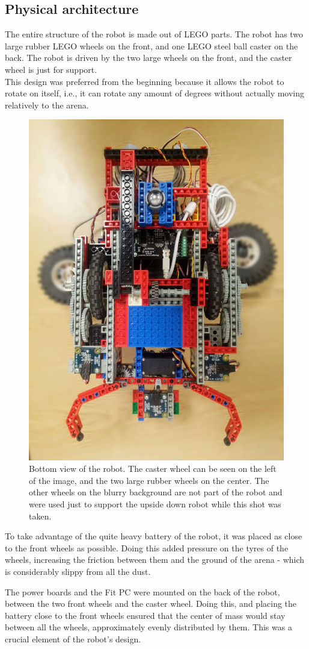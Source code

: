 \subsection{Physical architecture}

The entire structure of the robot is made out of LEGO parts. The robot has two large rubber LEGO wheels on the front, and one LEGO steel ball caster on the back. The robot is driven by the two large wheels on the front, and the caster wheel is just for support.\\
This design was preferred from the beginning because it allows the robot to rotate on itself, i.e., it can rotate any amount of degrees without actually moving relatively to the arena.

\clearpage

\begin{figure}[ht]
    \centering
    \includegraphics[height=0.7\linewidth, angle=90]{res/robot-pics/view-bottom.jpg}
    \caption{
        Bottom view of the robot. The caster wheel can be seen on the left of the image, and the two large rubber wheels on the center. The other wheels on the blurry background are not part of the robot and were used just to support the upside down robot while this shot was taken.
    }
\end{figure}

To take advantage of the quite heavy battery of the robot, it was placed as close to the front wheels as possible. Doing this added pressure on the tyres of the wheels, increasing the friction between them and the ground of the arena - which is considerably slippy from all the dust.

The power boards and the Fit PC were mounted on the back of the robot, between the two front wheels and the caster wheel. Doing this, and placing the battery close to the front wheels ensured that the center of mass would stay between all the wheels, approximately evenly distributed by them. This was a crucial element of the robot's design.


